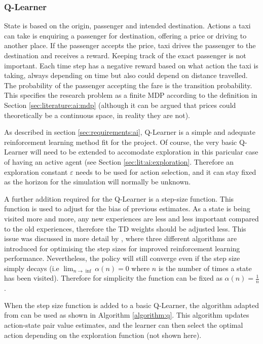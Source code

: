 \subsubsection{Q-Learner}
\label{sec:design:ai}

State is based on the origin, passenger and intended destination. Actions a
taxi can take is enquiring a passenger for destination, offering a price or
driving to another place. If the passenger accepts the price, taxi drives the
passenger to the destination and receives a reward. Keeping track of the exact
passenger is not important. Each time step has a negative reward based on what
action the taxi is taking, always depending on time but also could depend on
distance travelled. The probability of the passenger accepting the fare is the
transition probability. This specifies the research problem as a finite MDP
according to the definition in Section \ref{sec:literature:ai:mdp} (although it
can be argued that prices could theoretically be a continuous space, in reality
they are not).

As described in section \ref{sec:requirements:ai}, Q-Learner is a simple and
adequate reinforcement learning method fit for the project. Of course, the very
basic Q-Learner will need to be extended to accomodate exploration in this
paricular case of having an active agent (see Section
\ref{sec:lit:ai:exploration}. Therefore an exploration constant \(\varepsilon\)
needs to be used for action selection, and it can stay fixed as the horizon for
the simulation will normally be unknown.

A further addition required for the Q-Learner is a step-size function. This
function is used to adjust for the bias of previous estimates. As a state is
being visited more and more, any new experiences are less and less important
compared to the old experiences, therefore the TD weights should be adjusted
less. This issue was discussed in more detail by
\textcite{Sutton1994ai+stepsize}, where three different algorithms are
introduced for optimising the step sizes for improved reinforcement learning
performance. Nevertheless, the policy will still converge even if the step size
simply decays (i.e \(\lim_{n \to \inf}\alpha(n) = 0\) where \(n\) is the number
of times a state has been visited). Therefore for simplicity the function can
be fixed as \(\alpha(n)=\frac{1}{n}\).

When the step size function is added to a basic Q-Learner, the algorithm
adapted from \textcite{Sutton1998ai+reinforcement} can be used as shown in
Algorithm \ref{algorithm:q}. This algorithm updates action-state pair value
estimates, and the learner can then select the optimal action depending on the
exploration function (not shown here).

